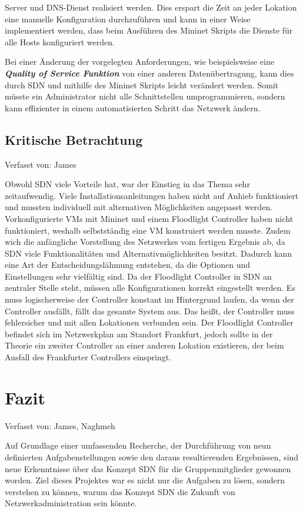\documentclass[fontsize=12pt,paper=a4,open=any,parskip=half,
  twoside=false,toc=listof,toc=bibliography,fleqn,leqno,
  captions=nooneline,captions=tableabove,british]{scrbook}
\begin{document}
{Server und DNS-Dienst realisiert werden. Dies erspart die Zeit an jeder Lokation eine manuelle Konfiguration durchzuführen und kann in einer Weise implementiert werden, dass beim Ausführen des Mininet Skripts die Dienste für alle Hosts konfiguriert werden. \par
Bei einer Änderung der vorgelegten Anforderungen, wie beispielsweise eine \textit{\textbf{Quality of Service Funktion}} von einer anderen Datenübertragung, kann dies durch SDN und mithilfe des Mininet Skripts leicht verändert werden. Somit müsste ein Administrator nicht alle Schnittstellen umprogrammieren, sondern kann effizienter in einem automatisierten Schritt das Netzwerk ändern.
\section{Kritische Betrachtung}
{\tiny Verfasst von: James\par}
Obwohl SDN viele Vorteile hat, war der Einstieg in das Thema sehr zeitaufwendig. Viele Installationsanleitungen haben nicht auf Anhieb funktioniert und mussten individuell mit alternativen Möglichkeiten angepasst werden. Vorkonfigurierte VMs mit Mininet und einem  Floodlight Controller haben nicht funktioniert, weshalb selbstständig eine VM konstruiert werden musste. Zudem wich die anfängliche Vorstellung des Netzwerkes vom fertigen Ergebnis ab, da SDN viele Funktionalitäten und Alternativmöglichkeiten besitzt. Dadurch kann eine Art der Entscheidungslähmung entstehen, da die Optionen und Einstellungen sehr vielfältig sind. Da der Floodlight Controller in SDN an zentraler Stelle steht, müssen alle Konfigurationen korrekt eingestellt werden. Es muss logischerweise der Controller konstant im Hintergrund laufen, da wenn der Controller ausfällt, fällt das gesamte System aus. Das heißt, der Controller muss fehlersicher und mit allen Lokationen verbunden sein. Der Floodlight Controller befindet sich im Netzwerkplan am Standort Frankfurt, jedoch sollte in der Theorie ein zweiter Controller an einer anderen Lokation existieren, der beim Ausfall des Frankfurter Controllers einspringt.  

\chapter{Fazit}\label{ch:fazit}
{\tiny Verfasst von: James, Naghmeh \par}
Auf Grundlage einer umfassenden Recherche, der Durchführung von neun definierten Aufgabenstellungen sowie den daraus resultierenden Ergebnissen, sind neue Erkenntnisse über das Konzept SDN für die Gruppenmitglieder gewonnen worden. Ziel dieses Projektes war es nicht nur die Aufgaben zu lösen, sondern verstehen zu können, warum das Konzept SDN die Zukunft von Netzwerkadministration sein könnte.   \par

}
\end{document}
